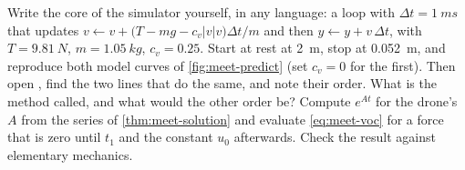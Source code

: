 \begin{exercises}
\exercise[3] Write the core of the simulator yourself, in any language: a loop with $\Delta t = \SI{1}{ms}$ that updates $v \leftarrow v + \big(T - mg - c_v|v|v\big)\Delta t/m$ and then $y \leftarrow y + v\,\Delta t$, with $T = \SI{9.81}{N}$, $m = \SI{1.05}{kg}$, $c_v = 0.25$. Start at rest at \SI{2}{m}, stop at \SI{0.052}{m}, and reproduce both model curves of \cref{fig:meet-predict} (set $c_v = 0$ for the first). Then open , find the two lines that do the same, and note their order. What is the method called, and what would the other order be?
\exercise[2] Compute $e^{At}$ for the drone's $A$ from the series of \cref{thm:meet-solution} and evaluate \cref{eq:meet-voc} for a force that is zero until $t_1$ and the constant $u_0$ afterwards. Check the result against elementary mechanics.
\end{exercises}
